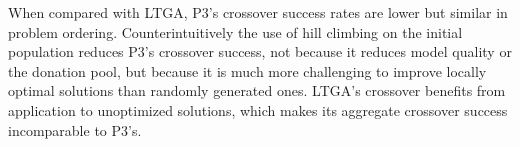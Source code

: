 \documentclass[twoside]{article}
\begin{document}
\begin{comment}
Solutions are only added to the next highest pyramid level if at least one crossover donation resulted in a fitness
improvement. Figure~\ref{fig-cross-success} examines the percentage of crossover donations that resulted in a fitness
improvement. The ordering in Figure~\ref{fig-cross-success} is an almost perfect inversion of Figure~\ref{fig-cross},
implying that the more successful crossover is at achieving fitness improving donations the lower the proportion of evaluations P3 will
spend performing crossover. P3 achieves an impressive 30\% success rate for crossover donations on the largest Deceptive Trap
problem sizes. This makes sense as crossover is able to immediately and perfectly identify entire traps such that all donations
always contain only complete traps. Furthermore, by forcing crossover to attempt donations of genes different from the current solution,
donations containing a single trap will have a very high success rate, always improving suboptimal traps which are far more frequently
created by local search that optimal traps. Rastrigin and HIFF have relatively high success rates of 11\% and 7\%, respectively. Again
this is likely due to accurate modeling and relatively low diversity of building block alternatives.
Ising Spin Glasses and Deceptive Step Trap both have low success rates near 0.01\%. This follows as both are difficult to model with
a linkage tree. In comparison to Figure~\ref{fig-cross-success} Deceptive Step Trap performs better than expected for crossover.
However, the reason for this is that even exceedingly uninformed crossover can make improvements to Deceptive Step Trap as
flipping two bits in the same trap will move between two local optima. Nearest Neighbor NK had the least successful crossovers,
with only 0.007\% successful on the largest tested problems. In comparison to Ising Spin Glass, NK's overlap is far more extensive.
As a result it makes sense that individual crossovers are very unlikely to be fitness improvements.
\end{comment}

When compared with LTGA, P3's crossover success rates are lower but similar in problem ordering.
Counterintuitively the use of hill climbing on the initial population reduces
P3's crossover success, not because it reduces model quality or the donation pool, but because it is much more challenging to improve
locally optimal solutions than randomly generated ones. LTGA's crossover benefits from application to unoptimized solutions, which
makes its aggregate crossover success incomparable to P3's.
\end{document}
